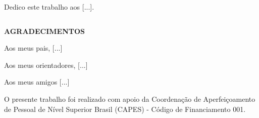\frontmatter
\makeinternaltitle

\clearpage\thispagestyle{empty}\null\vfill%

\begin{flushright}
    Dedico este trabalho aos [...].
\end{flushright}

\clearpage\thispagestyle{empty}$\ $%

\clearpage\thispagestyle{empty} \justifying

\begin{center} \bfseries \Large
    AGRADECIMENTOS
\end{center}
\vspace{1em}

\noindent Aos meus pais, [...]

\vspace{1em}

\noindent Aos meus orientadores, [...]

\vspace{1em}

\noindent Aos meus amigos [...]

\vspace{1em}

\noindent O presente trabalho foi realizado com apoio da Coordenação de Aperfeiçoamento de Pessoal de Nível Superior Brasil (CAPES) - Código de Financiamento 001.


\clearpage\thispagestyle{empty}\null\vfill%

